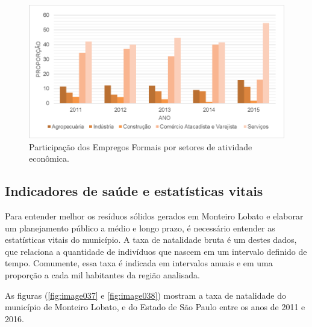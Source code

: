  \begin{figure}[h!]
 	\centering
 	\includegraphics[width=1\linewidth]{produtos/proddois/image036}
 	\caption{Participação dos Empregos Formais por setores de atividade econômica.}
 	\label{fig:image036}
 \end{figure}

\subsection{Indicadores de saúde e estatísticas vitais}

Para entender melhor os resíduos sólidos gerados em Monteiro Lobato e elaborar um planejamento público a médio e longo prazo, é necessário entender as estatísticas vitais do município. A taxa de natalidade bruta é um destes dados, que relaciona a quantidade de indivíduos que nascem em um intervalo definido de tempo. Comumente, essa taxa é indicada em intervalos anuais e em uma proporção a cada mil habitantes da região analisada. 

As figuras (\autoref{fig:image037} e \autoref{fig:image038}) mostram a taxa de natalidade do município de Monteiro Lobato, e do Estado de São Paulo entre os anos de 2011 e 2016.

